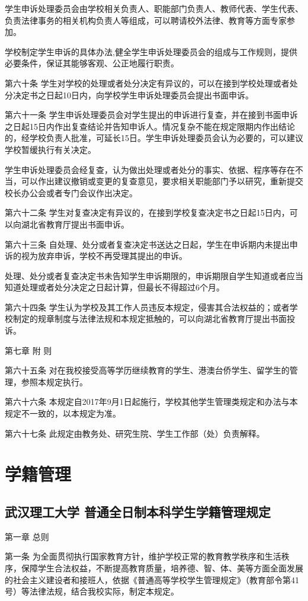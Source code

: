 \documentclass[UTF8,12pt,a4paper]{report}
\begin{document}
学生申诉处理委员会由学校相关负责人、职能部门负责人、教师代表、学生代表、负责法律事务的相关机构负责人等组成，可以聘请校外法律、教育等方面专家参加。

学校制定学生申诉的具体办法,健全学生申诉处理委员会的组成与工作规则，提供必要条件，保证其能够客观、公正地履行职责。　　

第六十条 学生对学校的处理或者处分决定有异议的，可以在接到学校处理或者处分决定书之日起10日内，向学校学生申诉处理委员会提出书面申诉。

第六十一条 学生申诉处理委员会对学生提出的申诉进行复查，并在接到书面申诉之日起15日内作出复查结论并告知申诉人。情况复杂不能在规定限期内作出结论的，经学校负责人批准，可延长15日。学生申诉处理委员会认为必要的，可以建议学校暂缓执行有关决定。

学生申诉处理委员会经复查，认为做出处理或者处分的事实、依据、程序等存在不当，可以作出建议撤销或变更的复查意见，要求相关职能部门予以研究，重新提交校长办公会或者专门会议作出决定。

第六十二条 学生对复查决定有异议的，在接到学校复查决定书之日起15日内，可以向湖北省教育厅提出书面申诉。

第六十三条 自处理、处分或者复查决定书送达之日起，学生在申诉期内未提出申诉的视为放弃申诉，学校不再受理其提出的申诉。

处理、处分或者复查决定书未告知学生申诉期限的，申诉期限自学生知道或者应当知道处理或者处分决定之日起计算，但最长不得超过6个月。

第六十四条 学生认为学校及其工作人员违反本规定，侵害其合法权益的；或者学校制定的规章制度与法律法规和本规定抵触的，可以向湖北省教育厅提出书面投诉。



第七章 附 则

第六十五条 对在我校接受高等学历继续教育的学生、港澳台侨学生、留学生的管理，参照本规定执行。

第六十六条  本规定自2017年9月1日起施行，学校其他学生管理类规定和办法与本规定不一致的，以本规定为准。

第六十七条  此规定由教务处、研究生院、学生工作部（处）负责解释。
	\part{学籍管理}
		\chapter{武汉理工大学 普通全日制本科学生学籍管理规定}
第一章  总则

第一条  为全面贯彻执行国家教育方针，维护学校正常的教育教学秩序和生活秩序，保障学生合法权益，不断提高教育质量，培养德、智、体、美等方面全面发展的社会主义建设者和接班人，依据《普通高等学校学生管理规定》（教育部令第41号）等法律法规，结合我校实际，制定本规定。
\end{document}
